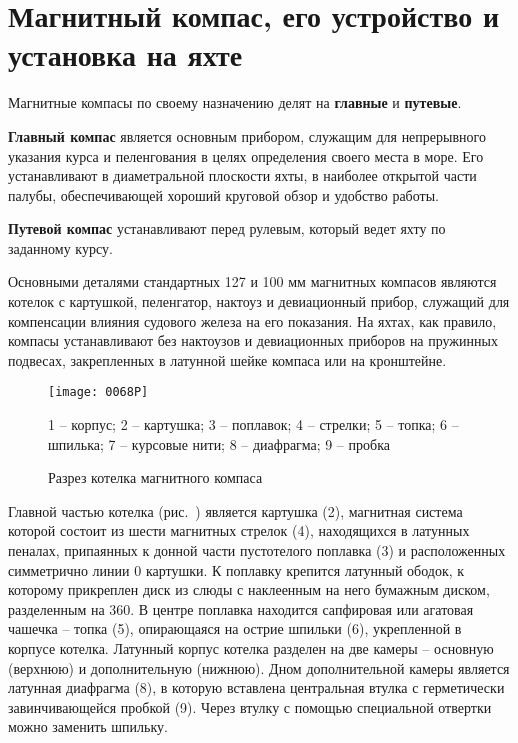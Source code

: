 \section{Магнитный компас, его устройство и установка на яхте}

Магнитные компасы по своему назначению делят на \textbf{главные} и
\textbf{путевые}.

\textbf{Главный компас}
является основным
прибором, служащим для непрерывного указания курса и пеленгования в
целях определения своего места в море. Его устанавливают в
диаметральной плоскости яхты, в наиболее открытой части палубы,
обеспечивающей хороший круговой обзор и удобство работы.

\textbf{Путевой компас}
устанавливают перед рулевым, который ведет
яхту по заданному курсу.

Основными деталями стандартных 127 и 100 мм магнитных компасов
являются котелок с картушкой, пеленгатор, нактоуз и девиационный
прибор, служащий для компенсации влияния судового железа на его
показания. На яхтах, как правило, компасы устанавливают без нактоузов
и девиационных приборов на пружинных подвесах, закрепленных в латунной
шейке компаса или на кронштейне.

\begin{figure}[htb]
  \centering{}
  \texttt{[image: 0068P]}
  \caption{Разрез котелка магнитного компаса}
  \label{fig:N68}
  \small
  \centering{}
  1 \--- корпус; 2 \--- картушка; 3 \--- поплавок; 4 \--- стрелки; 5 \--- топка; 6 \--- шпилька; 7 \--- курсовые нити; 8 \--- диафрагма; 9 \--- пробка
\end{figure} 

Главной частью котелка (рис.~) является картушка (2),
магнитная система которой состоит из шести магнитных стрелок (4),
находящихся в латунных пеналах, припаянных к донной части пустотелого
поплавка (3) и расположенных симметрично линии 0\gr
картушки. К поплавку крепится латунный ободок, к которому прикреплен
диск из слюды с наклеенным на него бумажным диском, разделенным на
360\gr. В центре поплавка находится сапфировая или агатовая чашечка
\--- топка (5), опирающаяся на острие шпильки (6), укрепленной в
корпусе котелка. Латунный корпус котелка разделен на две камеры \---
основную (верхнюю) и дополнительную (нижнюю). Дном дополнительной
камеры является латунная диафрагма (8), в которую вставлена
центральная втулка с герметически завинчивающейся пробкой (9). Через
втулку с помощью специальной отвертки можно заменить шпильку.

